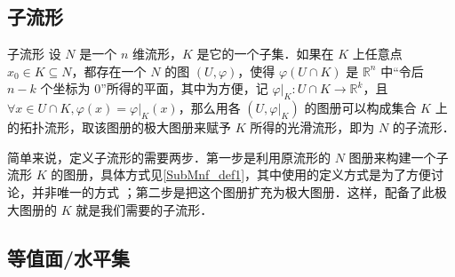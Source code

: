 
\begin{issues}
\issueDraft
\end{issues}


\subsection{子流形}

\begin{definition}{子流形}\label{SubMnf_def1}
设 $N$ 是一个 $n$ 维流形，$K$ 是它的一个子集．如果在 $K$ 上任意点 $x_0\in K\subseteq N$，都存在一个 $N$ 的图 $(U, \varphi)$，使得 $\varphi (U\cap K)$ 是 $\mathbb{R}^n$ 中“令后 $n-k$ 个坐标为 $0$”所得的平面，其中为方便，记 $\varphi|_K:U\cap K\rightarrow\mathbb{R}^k$，且 $\forall x\in U\cap K, \varphi(x)=\varphi|_K(x)$，那么用各 $(U, \varphi|_K)$ 的图册可以构成集合 $K$ 上的拓扑流形，取该图册的极大图册来赋予 $K$ 所得的光滑流形，即为 $N$ 的子流形．
\end{definition}

简单来说，定义子流形的需要两步．第一步是利用原流形的 $N$ 图册来构建一个子流形 $K$ 的图册，具体方式见\autoref{SubMnf_def1}，其中使用的定义方式是为了方便讨论，并非唯一的方式 ；第二步是把这个图册扩充为极大图册．这样，配备了此极大图册的 $K$ 就是我们需要的子流形．


\subsection{等值面/水平集}%
